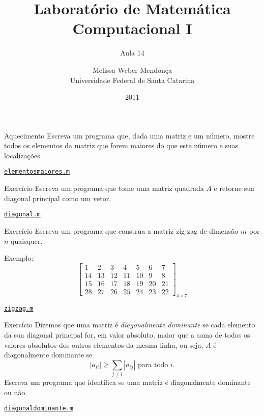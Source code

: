 \documentclass[hyperref={pdfpagelabels=false}]{beamer}
\title{Laboratório de Matemática Computacional I}
\subtitle{Aula 14}
\author[M. Weber Mendonça]{Melissa Weber Mendonça\\
Universidade Federal de Santa Catarina}
\date{2011}
\begin{document}
\setmonofont{Inconsolata}

\begin{frame}
  \titlepage
\end{frame}

\begin{frame}{Aquecimento}
  Escreva um programa que, dada uma matriz e um número, mostre todos os elementos da matriz que forem maiores do que este número e suas localizações.
	\vfill
	\begin{center} \href{listings/elementosmaiores.m}{\underline{\texttt{elementosmaiores.m}}} \end{center}
\end{frame}

\begin{frame}{Exercício}
  Escreva um programa que tome uma matriz quadrada $A$ e retorne sua diagonal principal como um vetor.
	\vfill
	\begin{center} \href{listings/diagonal.m}{\underline{\texttt{diagonal.m}}} \end{center}
\end{frame}

\begin{frame}{Exercício}
  Escreva um programa que construa a matriz zig-zag de dimensão $m$ por $n$ quaisquer.
   
  Exemplo:
  $$\begin{bmatrix}
    1 & 2 & 3 & 4 & 5 & 6 & 7\\
    14 & 13 & 12 & 11 & 10 & 9 & 8\\
    15 & 16 & 17 & 18 & 19 & 20 & 21\\
    28 & 27 & 26 & 25 & 24 & 23 & 22
    \end{bmatrix}_{4\times 7}$$
  \vfill
  \begin{center} \href{listings/zigzag.m}{\underline{\texttt{zigzag.m}}} \end{center}
\end{frame}

\begin{frame}{Exercício}
  Dizemos que uma matriz é \emph{diagonalmente dominante} se cada elemento da sua diagonal principal for, em valor absoluto, maior que a soma de todos os valores absolutos dos outros elementos da mesma linha, ou seja, $A$ é diagonalmente dominante se
  \begin{equation*}
    |a_{ii}| \geq \sum_{j\ne i} |a_{ij}| \mbox{ para todo } i.
  \end{equation*}
	Escreva um programa que identifica se uma matriz é diagonalmente dominante ou não.
  \vfill
  \begin{center} \href{listings/diagonaldominante.m}{\underline{\texttt{diagonaldominante.m}}} \end{center}
\end{frame}
\end{document}
